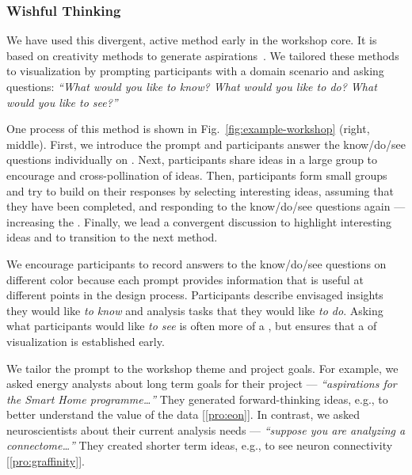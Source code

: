 \subsubsection*{Wishful Thinking} 

We have used this divergent, active method early in the workshop core. It is based on creativity methods to generate aspirations~\cite{Hicks2004}. We tailored these methods to visualization by prompting participants with a domain scenario and asking questions: {\it ``What would you like to know? What would you like to do? What would you like to see?''}

One process of this method is shown in Fig.~\ref{fig:example-workshop} (right, middle). First, we introduce the prompt and participants answer the know/do/see questions individually on \stickyNotes. Next, participants share ideas in a large group to encourage \collegiality and cross-pollination of ideas. Then, participants form small groups and try to build on their responses by selecting interesting ideas, assuming that they have been completed, and responding to the know/do/see questions again --- increasing the \challenge. Finally, we lead a convergent discussion to highlight interesting ideas and to transition to the next method.

We encourage participants to record answers to the know/do/see questions on different color \stickyNotes because each prompt provides information that is useful at different points in the design process. Participants describe envisaged insights they would like \emph{to know} and analysis tasks that they would like \emph{to do}. Asking what participants would like {\it to see} is often more of a \challenge, but ensures that a \topic of visualization is established early.

We tailor the prompt to the workshop theme and project goals. For example, we asked energy analysts about long term goals for their project --- \emph{``aspirations for the Smart Home programme\ldots''} They generated forward-thinking ideas, e.g., to better understand the value of the data [\ref{pro:eon}]. In contrast, we asked neuroscientists about their current analysis needs --- \emph{``suppose you are analyzing a connectome\ldots''} They created shorter term ideas, e.g., to see neuron connectivity [\ref{pro:graffinity}].


